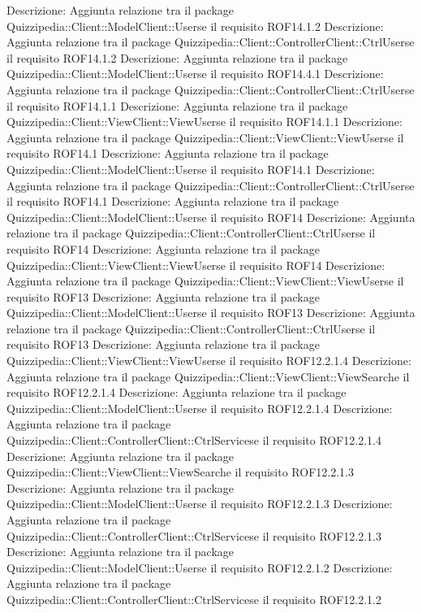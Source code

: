 Descrizione: Aggiunta relazione tra il package Quizzipedia::Client::ModelClient::Userse il requisito ROF14.1.2 
Descrizione: Aggiunta relazione tra il package Quizzipedia::Client::ControllerClient::CtrlUserse il requisito ROF14.1.2 
Descrizione: Aggiunta relazione tra il package Quizzipedia::Client::ModelClient::Userse il requisito ROF14.4.1 
Descrizione: Aggiunta relazione tra il package Quizzipedia::Client::ControllerClient::CtrlUserse il requisito ROF14.1.1 
Descrizione: Aggiunta relazione tra il package Quizzipedia::Client::ViewClient::ViewUserse il requisito ROF14.1.1 
Descrizione: Aggiunta relazione tra il package Quizzipedia::Client::ViewClient::ViewUserse il requisito ROF14.1 
Descrizione: Aggiunta relazione tra il package Quizzipedia::Client::ModelClient::Userse il requisito ROF14.1 
Descrizione: Aggiunta relazione tra il package Quizzipedia::Client::ControllerClient::CtrlUserse il requisito ROF14.1 
Descrizione: Aggiunta relazione tra il package Quizzipedia::Client::ModelClient::Userse il requisito ROF14 
Descrizione: Aggiunta relazione tra il package Quizzipedia::Client::ControllerClient::CtrlUserse il requisito ROF14 
Descrizione: Aggiunta relazione tra il package Quizzipedia::Client::ViewClient::ViewUserse il requisito ROF14 
Descrizione: Aggiunta relazione tra il package Quizzipedia::Client::ViewClient::ViewUserse il requisito ROF13 
Descrizione: Aggiunta relazione tra il package Quizzipedia::Client::ModelClient::Userse il requisito ROF13 
Descrizione: Aggiunta relazione tra il package Quizzipedia::Client::ControllerClient::CtrlUserse il requisito ROF13 
Descrizione: Aggiunta relazione tra il package Quizzipedia::Client::ViewClient::ViewUserse il requisito ROF12.2.1.4 
Descrizione: Aggiunta relazione tra il package Quizzipedia::Client::ViewClient::ViewSearche il requisito ROF12.2.1.4 
Descrizione: Aggiunta relazione tra il package Quizzipedia::Client::ModelClient::Userse il requisito ROF12.2.1.4 
Descrizione: Aggiunta relazione tra il package Quizzipedia::Client::ControllerClient::CtrlServicese il requisito ROF12.2.1.4 
Descrizione: Aggiunta relazione tra il package Quizzipedia::Client::ViewClient::ViewSearche il requisito ROF12.2.1.3 
Descrizione: Aggiunta relazione tra il package Quizzipedia::Client::ModelClient::Userse il requisito ROF12.2.1.3 
Descrizione: Aggiunta relazione tra il package Quizzipedia::Client::ControllerClient::CtrlServicese il requisito ROF12.2.1.3 
Descrizione: Aggiunta relazione tra il package Quizzipedia::Client::ModelClient::Userse il requisito ROF12.2.1.2 
Descrizione: Aggiunta relazione tra il package Quizzipedia::Client::ControllerClient::CtrlServicese il requisito ROF12.2.1.2 

